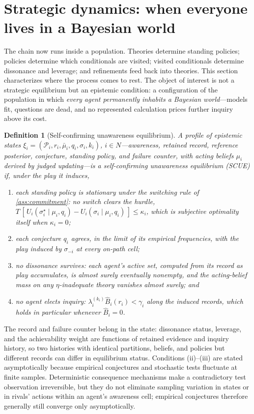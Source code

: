 \documentclass[11pt]{article}
\newtheorem{definition}[assumption]{Definition}
\theoremstyle{definition}
\begin{document}
\section{Strategic dynamics: when everyone lives in a Bayesian world}
\label{sec:dynamics}

The chain now runs inside a population.
Theories determine standing policies; policies determine which conditionals are visited; visited conditionals determine dissonance and leverage; and refinements feed back into theories.
This section characterizes where the process comes to rest.
The object of interest is not a strategic equilibrium but an epistemic condition: a configuration of the population in which \emph{every agent permanently inhabits a Bayesian world}---models fit, questions are dead, and no represented calculation prices further inquiry above its cost.

\begin{definition}[Self-confirming unawareness equilibrium]
\label{def:scue}
A profile of epistemic states $\xi_i=(\mathcal P_i,r_i,\bar\mu_i,q_i,\sigma_i,k_i)$, $i\in N$---awareness, retained record, reference posterior, conjecture, standing policy, and failure counter, with acting beliefs $\mu_i$ derived by judged updating---is a \emph{self-confirming unawareness equilibrium} (SCUE) if, under the play it induces,
\begin{enumerate}[label=(\roman*)]
  \item each standing policy is stationary under the switching rule of \cref{ass:commitment}: no switch clears the hurdle, $T\,[\,U_i(\sigma_i^{\star}\mid\mu_i,q_i)-U_i(\sigma_i\mid\mu_i,q_i)\,]\le\kappa_i$, which is subjective optimality itself when $\kappa_i=0$;
  \item each conjecture $q_i$ agrees, in the limit of its empirical frequencies, with the play induced by $\sigma_{-i}$ at every on-path cell;
  \item no dissonance survives: each agent's active set, computed from its record as play accumulates, is almost surely eventually nonempty, and the acting-belief mass on any $\eta$-inadequate theory vanishes almost surely; and
  \item no agent elects inquiry: $\lambda_i^{(k_i)}\widehat B_i(r_i)<\gamma_i$ along the induced records, which holds in particular whenever $\widehat B_i=0$.
\end{enumerate}
\end{definition}

The record and failure counter belong in the state: dissonance status, leverage, and the achievability weight are functions of retained evidence and inquiry history, so two histories with identical partitions, beliefs, and policies but different records can differ in equilibrium status.
Conditions (ii)--(iii) are stated asymptotically because empirical conjectures and stochastic tests fluctuate at finite samples.
Deterministic consequence mechanisms make a contradictory test observation irreversible, but they do not eliminate sampling variation in states or in rivals' actions within an agent's awareness cell; empirical conjectures therefore generally still converge only asymptotically.
\end{document}
